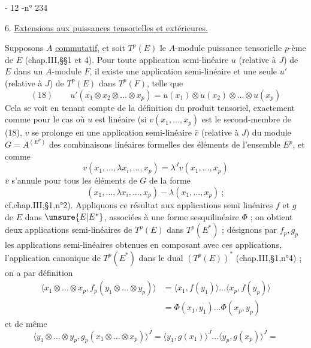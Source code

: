
- 12 -\hfill n° 234

6. \uline{Extensions aux puissances tensorielles et extérieures.}

Supposons $A$ \uline{commutatif}, et soit $T^p(E)$ le $A$-module puissance tensorielle $p$-ème de $E$ (chap.III,\S\S1 et 4). Pour toute application semi-linéaire $u$ (relative à $J$) de $E$ dans un $A$-module $F$, il existe une application semi-linéaire et une seule $u'$ (relative à $J$) de $T^p(E)$ dans $T^p(F)$, telle que
\[
(18)\qquad u'(x_1\otimes x_2\otimes\ldots\otimes x_p)=u(x_1)\otimes u(x_2)\otimes\ldots\otimes u(x_p)
\]
Cela se voit en tenant compte de la définition du produit tensoriel, exactement comme pour le cas où $u$ est linéaire (si $v(x_1,\ldots,x_p)$ est le second-membre de (18), $v$ se prolonge en une application semi-linéaire $\bar v$ (relative à $J$) du module $G=A^{(E^p)}$ des combinaisons linéaires formelles des éléments de l'ensemble $E^p$, et comme
\[
v(x_1,\ldots,\lambda x_i,\ldots,x_p)=\lambda^J v(x_1,\ldots,x_p)
\]
$\bar v$ s'annule pour tous les éléments de $G$ de la forme
\[
(x_1,\ldots,\lambda x_i,\ldots,x_p)-\lambda(x_1,\ldots,x_p)\ ;
\]
cf.chap.III,\S1,n°2). Appliquons ce résultat aux applications semi linéaires $f$ et $g$ de $E$ dans $\unsure{E|E^*}$, associées à une forme sesquilinéaire $\Phi$ ; on obtient deux applications semi-linéaires de $T^p(E)$ dans $T^p(E^*)$ ; désignons par $f_p,g_p$ les applications semi-linéaires obtenues en composant avec ces applications, l'application canonique de $T^p(E^*)$ dans le dual $(T^p(E))^*$ (chap.III,\S1,n°4) ; on a par définition
\[
\begin{aligned}
\langle x_1\otimes\ldots\otimes x_p,f_p(y_1\otimes\ldots\otimes y_p)\rangle
&=\langle x_1,f(y_1)\rangle\ldots\langle x_p,f(y_p)\rangle\\
&=\Phi(x_1,y_1)\ldots\Phi(x_p,y_p)
\end{aligned}
\]
et de même
\[
\langle y_1\otimes\ldots\otimes y_p,g_p(x_1\otimes\ldots\otimes x_p)\rangle^J
=\langle y_1,g(x_1)\rangle^J\ldots\langle y_p,g(x_p)\rangle^J=
\]
